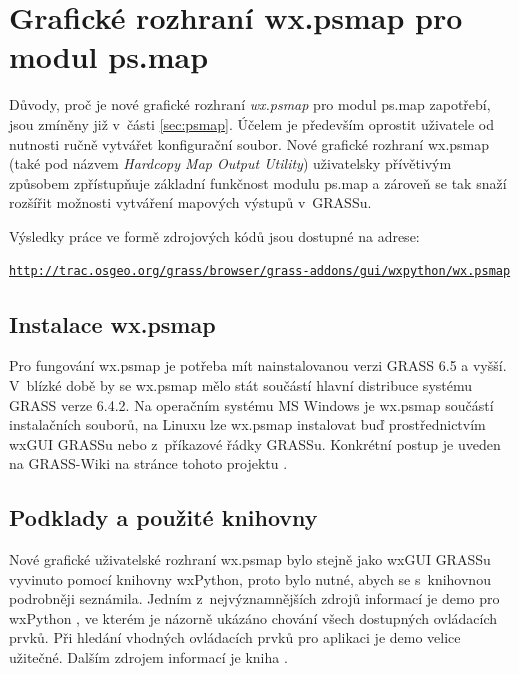 \documentclass[a4paper,12pt,draft]{article}
\newif\ifbc %
\begin{document}
\section[Grafické rozhraní pro modul ps.map]{Grafické rozhraní
 wx.psmap pro modul ps.map}
\label{sec:gui}

Důvody, proč je nové grafické rozhraní \emph{wx.psmap} pro
modul ps.map zapotřebí, jsou zmíněny již v~části
\ref{sec:psmap}. Účelem je především oprostit uživatele od nutnosti
ručně vytvářet konfigurační soubor. Nové grafické rozhraní wx.psmap (také
pod názvem \emph{Hardcopy Map Output Utility}) uživatelsky
přívětivým způsobem zpřístupňuje zá\-kladní funkčnost modulu
ps.map a zároveň se tak snaží rozšířit možnosti vytváření
mapových výstupů v~GRASSu.

Výsledky práce ve formě zdrojových kódů jsou dostupné na adrese:

\begin{alltt}\small
\url{http://trac.osgeo.org/grass/browser/grass-addons/gui/wxpython/wx.psmap}
\end{alltt}

\ifbc
a také na přiloženém CD.\fi

\subsection{Instalace wx.psmap}
Pro fungování wx.psmap je potřeba mít nainstalovanou verzi
GRASS 6.5 a vyšší. V~blízké době by se wx.psmap mělo stát součástí hlavní
distribuce systému GRASS verze 6.4.2. Na operačním systému MS Windows je
wx.psmap součástí instalačních souborů, na Linuxu lze wx.psmap instalovat buď
prostřednictvím wxGUI GRASSu nebo z~příkazové řádky GRASSu. Konkrétní
postup je uveden na GRASS-Wiki na stránce tohoto projektu
\cite{wiki_wxpsmap}\ifbc a také v~příloze \ref{priloha:instalace_GUI}\fi.

\subsection{Podklady a použité knihovny}
Nové grafické uživatelské rozhraní wx.psmap bylo stejně jako wxGUI
GRASSu vyvinuto pomocí knihovny wxPython,
proto bylo nutné, abych se s~knihovnou podrobněji seznámila. Jedním
z~nejvýznamnějších zdrojů informací je demo pro wxPython \cite{demo},
ve kterém je názorně ukázáno chování všech dostupných ovládacích
prvků. Při hledání vhodných ovládacích prvků pro aplikaci je demo velice
užitečné.
Dalším zdrojem informací je kniha \cite{wxPythonInAction}.
\end{document}
